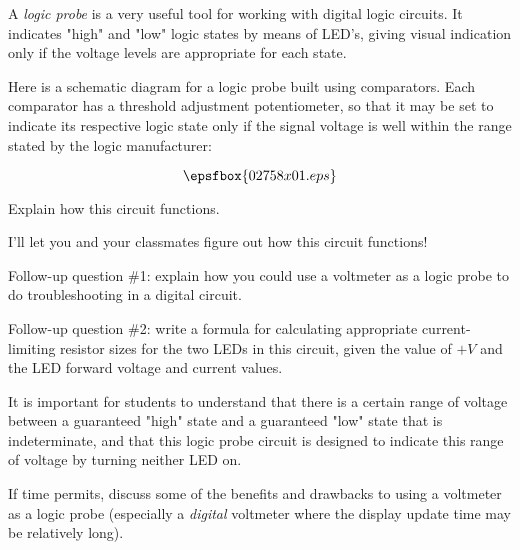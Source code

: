 

A {\it logic probe} is a very useful tool for working with digital logic circuits.  It indicates "high" and "low" logic states by means of LED's, giving visual indication only if the voltage levels are appropriate for each state.

Here is a schematic diagram for a logic probe built using comparators.  Each comparator has a threshold adjustment potentiometer, so that it may be set to indicate its respective logic state only if the signal voltage is well within the range stated by the logic manufacturer:

$$\epsfbox{02758x01.eps}$$

Explain how this circuit functions.







I'll let you and your classmates figure out how this circuit functions!

\vskip 10pt

Follow-up question \#1: explain how you could use a voltmeter as a logic probe to do troubleshooting in a digital circuit.

\vskip 10pt

Follow-up question \#2: write a formula for calculating appropriate current-limiting resistor sizes for the two LEDs in this circuit, given the value of $+V$ and the LED forward voltage and current values.







It is important for students to understand that there is a certain range of voltage between a guaranteed "high" state and a guaranteed "low" state that is indeterminate, and that this logic probe circuit is designed to indicate this range of voltage by turning neither LED on.

If time permits, discuss some of the benefits and drawbacks to using a voltmeter as a logic probe (especially a {\it digital} voltmeter where the display update time may be relatively long).




